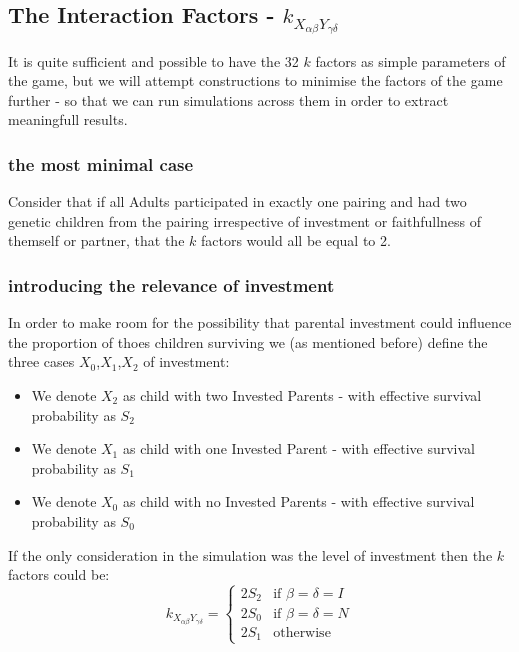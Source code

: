 \documentclass[journal,article,accept,oneauthors,pdftex,10pt,a4paper]{mdpi}
\begin{document}
\subsection{The Interaction Factors - $k_{X_{\alpha\beta}Y_{\gamma\delta}}$}

It is quite sufficient and possible to have the 32 $k$ factors as simple parameters of the game, but we will attempt constructions to minimise the factors of the game further - so that we can run simulations across them in order to extract meaningfull results.

\subsubsection{the most minimal case}

Consider that if all Adults participated in exactly one pairing and had two genetic children from the pairing irrespective of investment or faithfullness of themself or partner, that the $k$ factors would all be equal to 2.

\subsubsection{introducing the relevance of investment}

In order to make room for the possibility that parental investment could influence the proportion of thoes children surviving we (as mentioned before) define the three cases $X_0$,$X_1$,$X_2$ of investment:
\begin{itemize}
  \item We denote $X_2$ as child with two Invested Parents - with effective survival probability as $S_2$
  \item We denote $X_1$ as child with one Invested Parent - with effective survival probability as $S_1$
  \item We denote $X_0$ as child with no Invested Parents - with effective survival probability as $S_0$
\end{itemize}

If the only consideration in the simulation was the level of investment then the $k$ factors could be:
$$ k_{X_{\alpha\beta}Y_{\gamma\delta}} =
\left\{
	\begin{array}{ll}
		2S_2  & \mbox{if } \beta=\delta=I \\
		2S_0  & \mbox{if } \beta=\delta=N \\
		2S_1  & \mbox{otherwise }
	\end{array}
\right. $$
\end{document}
